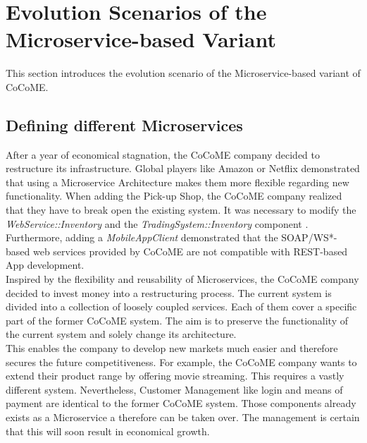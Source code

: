
\section{Evolution Scenarios of the Microservice-based Variant}
This section introduces the evolution scenario of the Microservice-based variant of
CoCoME.
\subsection{Defining different Microservices}
After a year of economical stagnation, the CoCoME company decided to restructure its infrastructure. Global players like Amazon or Netflix demonstrated that using a Microservice Architecture makes them more flexible regarding new functionality. When adding the Pick-up Shop, the CoCoME company realized that they have to break open the existing system. It was necessary to modify the \textit{WebService::Inventory} and the \textit{TradingSystem::Inventory} component \cite{HeinrichRostamiReussner2016_1000052688}. Furthermore, adding a \textit{MobileAppClient} demonstrated that the SOAP/WS*-based web services provided by CoCoME are not compatible with REST-based App development.
\\
Inspired by the flexibility and reusability of Microservices, the CoCoME company decided to invest money into a restructuring process. The current system is divided into a collection of loosely coupled services. Each of them cover a specific part of the former CoCoME system. The aim is to preserve the functionality of the current system and solely change its architecture.
\\
 This enables the company to develop new markets much easier and therefore secures the future competitiveness. For example, the CoCoME company wants to extend their product range by offering movie streaming. This requires a vastly different system. Nevertheless, Customer Management like login and means of payment are identical to the former CoCoME system. Those components already exists as a Microservice a therefore can be taken over. The management is certain that this will soon result in economical growth.








	
	

